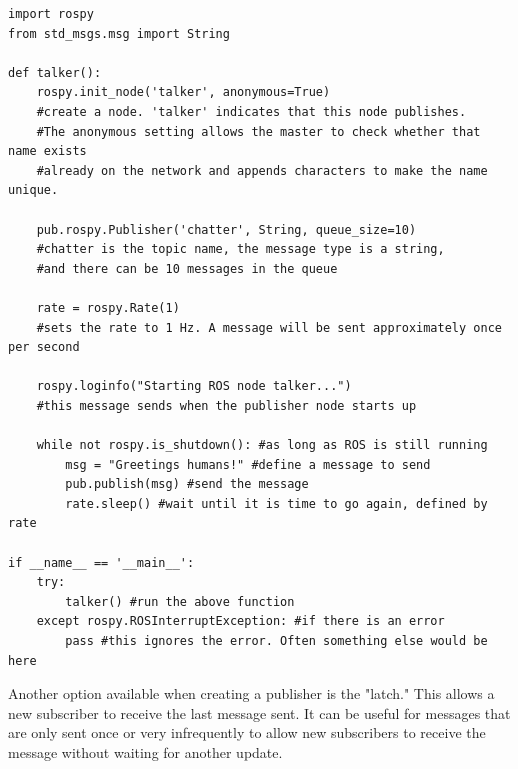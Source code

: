 \documentclass[twoside]{article}
\begin{document}
\begin{verbatim}
import rospy
from std_msgs.msg import String

def talker():
    rospy.init_node('talker', anonymous=True)
    #create a node. 'talker' indicates that this node publishes. 
    #The anonymous setting allows the master to check whether that name exists
    #already on the network and appends characters to make the name unique.
    
    pub.rospy.Publisher('chatter', String, queue_size=10)
    #chatter is the topic name, the message type is a string, 
    #and there can be 10 messages in the queue
    
    rate = rospy.Rate(1) 
    #sets the rate to 1 Hz. A message will be sent approximately once per second
    
    rospy.loginfo("Starting ROS node talker...")
    #this message sends when the publisher node starts up
    
    while not rospy.is_shutdown(): #as long as ROS is still running
        msg = "Greetings humans!" #define a message to send
        pub.publish(msg) #send the message
        rate.sleep() #wait until it is time to go again, defined by rate

if __name__ == '__main__':
    try:
        talker() #run the above function
    except rospy.ROSInterruptException: #if there is an error
        pass #this ignores the error. Often something else would be here

\end{verbatim}

Another option available when creating a publisher is the "latch." This allows a new subscriber to receive the last message sent. It can be useful for messages that are only sent once or very infrequently to allow new subscribers to receive the message without waiting for another update.
\end{document}
